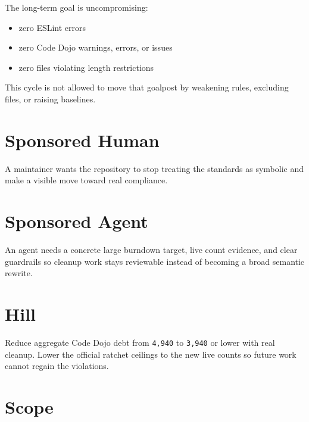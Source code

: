 The long-term goal is uncompromising:

\begin{itemize}
\tightlist
\item
  zero ESLint errors
\item
  zero Code Dojo warnings, errors, or issues
\item
  zero files violating length restrictions
\end{itemize}

This cycle is not allowed to move that goalpost by weakening rules, excluding files, or raising baselines.

\section{Sponsored Human}\label{record-217-sponsored-human}

A maintainer wants the repository to stop treating the standards as symbolic and make a visible move toward real compliance.

\section{Sponsored Agent}\label{record-217-sponsored-agent}

An agent needs a concrete large burndown target, live count evidence, and clear guardrails so cleanup work stays reviewable instead of becoming a broad semantic rewrite.

\section{Hill}\label{record-217-hill}

Reduce aggregate Code Dojo debt from \texttt{4\allowbreak{},\allowbreak{}9\allowbreak{}4\allowbreak{}0} to \texttt{3\allowbreak{},\allowbreak{}9\allowbreak{}4\allowbreak{}0} or lower with real cleanup. Lower the official ratchet ceilings to the new live counts so future work cannot regain the violations.

\section{Scope}\label{record-217-scope}

